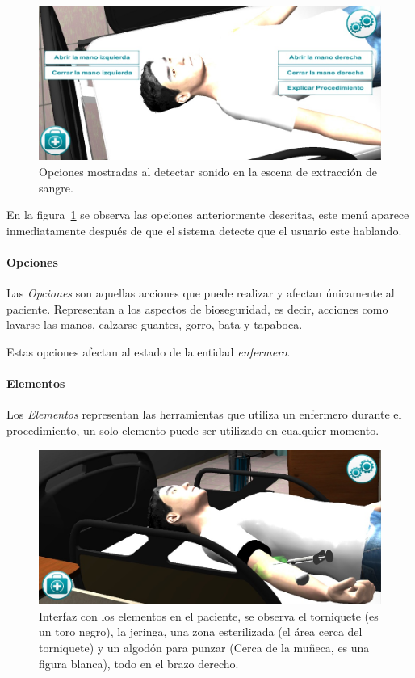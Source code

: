 \begin{figure}[H]
\centering
\includegraphics[scale=0.5]{propuesta/hemocultivo_comando_voz.jpg}
\caption{Opciones mostradas al detectar sonido en la escena de extracción
    de sangre.}
\label{fig:hemocultivo_voz_gui}
\end{figure}

En la figura~\ref{fig:hemocultivo_voz_gui} se observa las opciones anteriormente
descritas, este menú aparece inmediatamente después de que el sistema detecte
que el usuario este hablando.

\paragraph{Opciones}

Las \emph{Opciones} son aquellas acciones que puede realizar y afectan
únicamente al paciente. Representan a los aspectos de bioseguridad, es decir,
acciones como lavarse las manos, calzarse guantes, gorro, bata y tapaboca.

Estas opciones afectan al estado de la entidad \emph{enfermero}.

\paragraph{Elementos}

Los \emph{Elementos} representan las herramientas que utiliza un enfermero
durante el procedimiento, un solo elemento puede ser utilizado en cualquier
momento.


\begin{figure}[H]
\centering
\includegraphics[scale=0.5]{propuesta/hemocultivo_elementos.jpg}
\caption{Interfaz con los elementos en el paciente, se observa el torniquete (es
    un toro negro), la jeringa, una zona esterilizada (el área cerca del
    torniquete) y un algodón para punzar (Cerca de la muñeca, es una figura
    blanca), todo en el brazo derecho.}
\label{fig:hemocultivo_elementos}
\end{figure}

